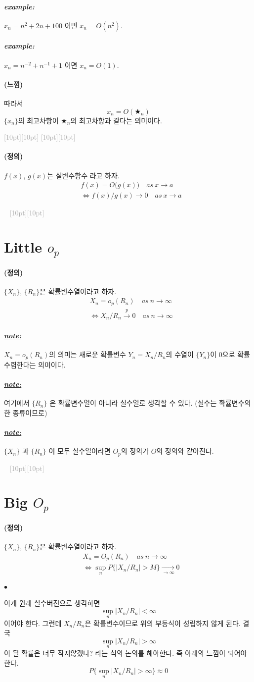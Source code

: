 \documentclass[12pt,oneside,english]{book}
\newcommand{\dash}{\vspace{2em}\noindent \textcolor{darkgray}{\hrulefill~ \raisebox{-2.5pt}[10pt][10pt]{\leafright \decofourleft \decothreeleft  \aldineright \decotwo \floweroneleft \decoone   \floweroneright \decotwo \aldineleft\decothreeright \decofourright \leafleft} ~  \hrulefill \\ \vspace{2em}}}
\newcommand{\rdash}{\noindent \textcolor{darkgray}{ \raisebox{-1.9pt}[10pt][10pt]{\leafright} \hrulefill \raisebox{-1.9pt}[10pt][10pt]{\leafright \decofourleft \decothreeleft  \aldineright \decotwo \floweroneleft \decoone}}}
\def\ck{\paragraph{\large$\bullet$}\large}
\def\dfn{\paragraph{\large(정의)}\large}
\def\fl{\paragraph{\large(느낌)}\large}
\def\note{\paragraph{\large\textit{\underline{note:}}}\large}
\def\ex{\paragraph{\large\textit{example:}}\large}
\begin{document}
\ex $x_n=n^2+2n+100$ 이면 $x_n=O(n^2)$.

\ex $x_n=n^{-2}+n^{-1}+1$ 이면 $x_n=O(1)$.

\fl 따라서 
\[
x_n=O(\bigstar_n)
\]
$\{x_n\}$의 최고차항이 $\bigstar_n$의 최고차항과 같다는 의미이다. 

\rdash 

\dfn $f(x)$, $g(x)$는 실변수함수 라고 하자. 
\begin{align*}
& f(x)=O\big(g(x)\big) \quad as~  x\to a \\
&\Longleftrightarrow f(x)/g(x) \to 0 \quad as ~ x \to a
\end{align*}

\dash

\section{Little $o_p$}
\dfn $\{X_n\}$, $\{R_n\}$은 확률변수열이라고 하자. 
\begin{align*}
& X_n=o_p(R_n) \quad as ~ n\to \infty \\ 
& \Longleftrightarrow X_n/R_n \overset{p}{\to} 0 \quad as ~ n\to \infty 
\end{align*}

\note $X_n=o_p(R_n)$의 의미는 새로운 확률변수 $Y_n=X_n/R_n$의 수열이 $\{Y_n\}$이 $0$으로 확률수렴한다는 의미이다. 

\note 여기에서 $\{R_n\}$ 은 확률변수열이 아니라 실수열로 생각할 수 있다. (실수는 확률변수의 한 종류이므로)

\note $\{X_n\}$ 과 $\{R_n\}$ 이 모두 실수열이라면 $O_p$의 정의가 $O$의 정의와 같아진다. 

\dash

\section{Big $O_p$}
\dfn $\{X_n\}$, $\{R_n\}$은 확률변수열이라고 하자. 
\begin{align*}
& X_n=O_p(R_n) \quad as ~ n\to \infty \\ 
& \Longleftrightarrow \sup_{n}P\{|X_n/R_n|>M\} \underset{\to\infty}{\to} 0
\end{align*}

\ck 이게 원래 실수버전으로 생각하면 
\[
\sup_{n}|X_n / R_n| < \infty
\]
이어야 한다. 그런데 $X_n/R_n$은 확률변수이므로 위의 부등식이 성립하지 않게 된다. 결국 
\[
\sup_{n}|X_n / R_n| > \infty
\]
이 될 확률은 너무 작지않겠냐? 라는 식의 논의를 해야한다. 즉 아래의 느낌이 되어야 한다. 
\[
P\{\sup_{n}|X_n / R_n| > \infty\} \approx 0
\]
\end{document}
